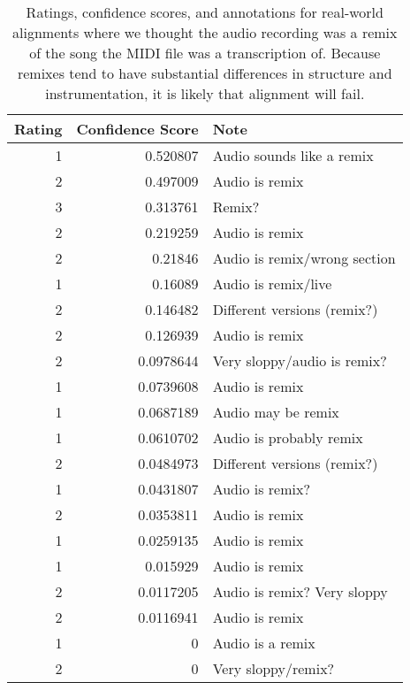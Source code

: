 \begin{table}
\centering
\begin{tabular}{rrl}
\toprule
   Rating &   Confidence Score & Note                         \\
\midrule
        1 &          0.520807  & Audio sounds like a remix    \\
        2 &          0.497009  & Audio is remix               \\
        3 &          0.313761  & Remix?                       \\
        2 &          0.219259  & Audio is remix               \\
        2 &          0.21846   & Audio is remix/wrong section \\
        1 &          0.16089   & Audio is remix/live          \\
        2 &          0.146482  & Different versions (remix?)  \\
        2 &          0.126939  & Audio is remix               \\
        2 &          0.0978644 & Very sloppy/audio is remix?  \\
        1 &          0.0739608 & Audio is remix               \\
        1 &          0.0687189 & Audio may be remix           \\
        1 &          0.0610702 & Audio is probably remix      \\
        2 &          0.0484973 & Different versions (remix?)  \\
        1 &          0.0431807 & Audio is remix?              \\
        2 &          0.0353811 & Audio is remix               \\
        1 &          0.0259135 & Audio is remix               \\
        1 &          0.015929  & Audio is remix               \\
        2 &          0.0117205 & Audio is remix?  Very sloppy \\
        2 &          0.0116941 & Audio is remix               \\
        1 &          0         & Audio is a remix             \\
        2 &          0         & Very sloppy/remix?           \\
\bottomrule
\end{tabular}
  \caption[Ratings for alignments which we annotated as likely remixes]{Ratings, confidence scores, and annotations for real-world alignments where we thought the audio recording was a remix of the song the MIDI file was a transcription of.
Because remixes tend to have substantial differences in structure and instrumentation, it is likely that alignment will fail.}
  \label{tab:ratings}
\end{table}

